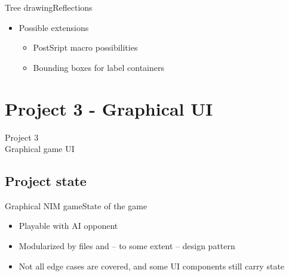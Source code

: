 \documentclass{beamer}
\begin{document}
\begin{frame}{Tree drawing}{Reflections}
  \begin{itemize}
  \item {
    Possible extensions
  }
  \begin{itemize}
    \item PostSript macro possibilities
    \item Bounding boxes for label containers
    \end{itemize}
  \end{itemize}
\end{frame}
\section{Project 3 - Graphical UI}
\begin{frame}[plain,c]
\begin{center}
\Huge Project 3\\
\vspace{5mm}
\Large Graphical game UI
\end{center}
\end{frame}


\subsection{Project state}
\begin{frame}{Graphical NIM game}{State of the game}
  \begin{itemize}
  \item {
    Playable with AI opponent
  }
  \item {
    Modularized by files and -- to some extent -- design pattern
  }
  \item {
    Not all edge cases are covered, and some UI components still carry state
  }
  \end{itemize}
\end{frame}
\end{document}
